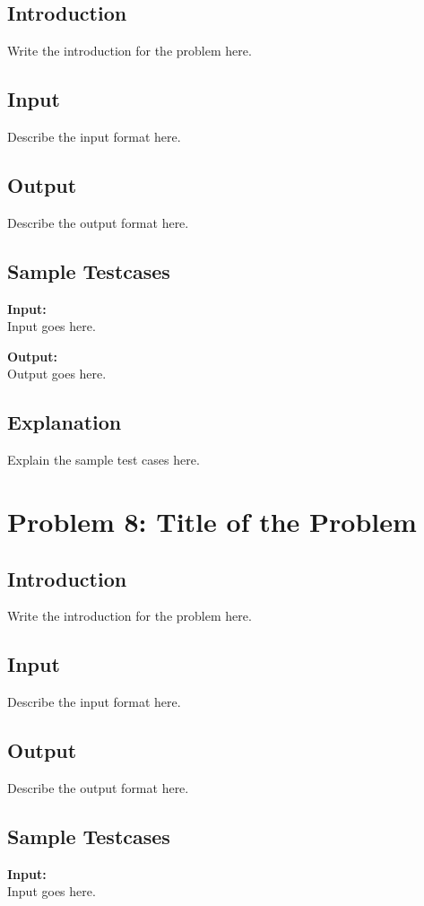 \documentclass[12pt]{article}
\begin{document}
\subsection*{Introduction}
Write the introduction for the problem here.

\subsection*{Input}
Describe the input format here.

\subsection*{Output}
Describe the output format here.

\subsection*{Sample Testcases}
\textbf{Input:} \\
Input goes here.

\textbf{Output:} \\
Output goes here.

\subsection*{Explanation}
Explain the sample test cases here.

\newpage

\section*{Problem 8: Title of the Problem}

\subsection*{Introduction}
Write the introduction for the problem here.

\subsection*{Input}
Describe the input format here.

\subsection*{Output}
Describe the output format here.

\subsection*{Sample Testcases}
\textbf{Input:} \\
Input goes here.
\end{document}
